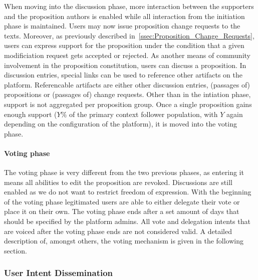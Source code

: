 When moving into the discussion phase, more interaction between the supporters and the proposition authors is enabled while all interaction from the initiation phase is maintained.
Users may now issue proposition change requests to the texts.
Moreover, as previously described in~\ref{ssec:Proposition_Change_Requests}, users can express support for the proposition under the condition that a given modificiation request gets accepted or rejected.
As another means of community involvement in the proposition constitution, users can discuss a proposition.
In discussion entries, special links can be used to reference other artifacts on the platform.
Referencable artifacts are either other discussion entries, (passages of) propositions or (passages of) change requests.
Other than in the intiation phase, support is not aggregated per proposition group.
Once a single proposition gains enough support ($Y\%$ of the primary context follower population, with $Y$ again depending on the configuration of the platform), it is moved into the voting phase.

\paragraph{Voting phase}
\label{ssec:Lifecycle_Voting}
The voting phase is very different from the two previous phases, as entering it means all abilities to edit the proposition are revoked.
Discussions are still enabled as we do not want to restrict freedom of expression.
With the beginning of the voting phase legitimated users are able to either delegate their vote or place it on their own.
The voting phase ends after a set amount of days that should be specified by the platform admins.
All vote and delegation intents that are voiced after the voting phase ends are not considered valid.
A detailed description of, amongst others, the voting mechanism is given in the following section.

\subsubsection{User Intent Dissemination}
\label{sec:User_Intent_Dissemination}




